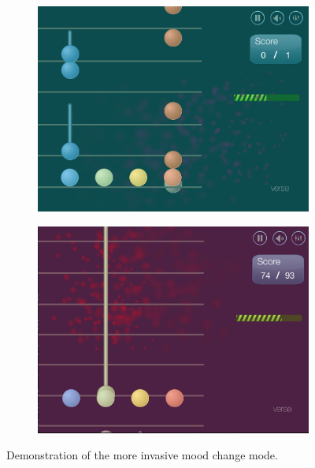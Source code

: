\begin{figure}[b]
        \centering
        \begin{subfigure}[b]{0.45\textwidth}
                \includegraphics[width=\textwidth]{Figures/screengreen}
        \end{subfigure}
        \begin{subfigure}[b]{0.45\textwidth}
                \includegraphics[width=\textwidth]{Figures/screenred}
        \end{subfigure}
          \caption{Demonstration of the more invasive mood change mode.}
        \label{fig:moodchangescreen}
\end{figure}


